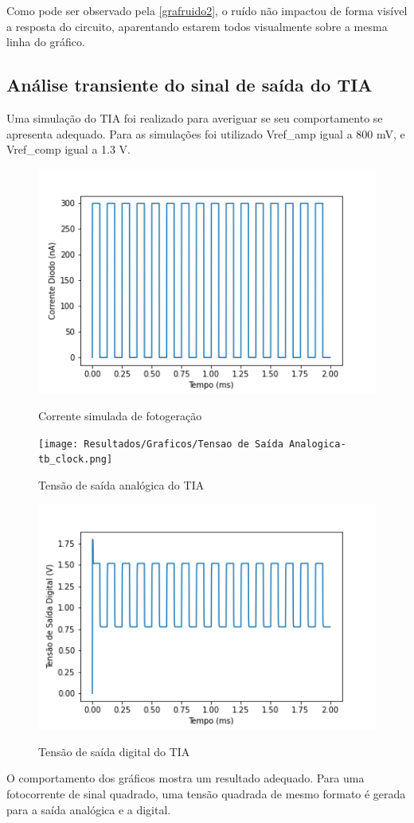 Como pode ser observado pela \autoref{grafruido2}, o ruído não impactou de forma visível a resposta do circuito, aparentando estarem todos visualmente sobre a mesma linha do gráfico.

\subsection{Análise transiente do sinal de saída do TIA}
\label{DCAPS}

Uma simulação do TIA foi realizado para averiguar se seu comportamento se apresenta adequado. Para as simulações foi utilizado Vref\_amp igual a 800 mV, e Vref\_comp igual a 1.3 V.

\begin{figure}[htb]
 \centering
    \caption{Corrente simulada de fotogeração} 
    \includegraphics[scale=1]{Resultados/Graficos/Corrente Diodo-tb_clock.png}
    \label{graf_tiasinal}
\end{figure}

\begin{figure}[htb]
 \centering
    \caption{Tensão de saída analógica do TIA} 
    \texttt{[image: Resultados/Graficos/Tensao de Saída Analogica-tb\_clock.png]}
    \label{graf_tiasinal2}
\end{figure}

\begin{figure}[htb]
 \centering
    \caption{Tensão de saída digital do TIA} 
    \includegraphics[scale=1]{Resultados/Graficos/Tensao de Saida Digital-tb_clock.png}
    \label{graf_tiasinal3}
\end{figure}

O comportamento dos gráficos mostra um resultado adequado. Para uma fotocorrente de sinal quadrado, uma tensão quadrada de mesmo formato é gerada para a saída analógica e a digital.

